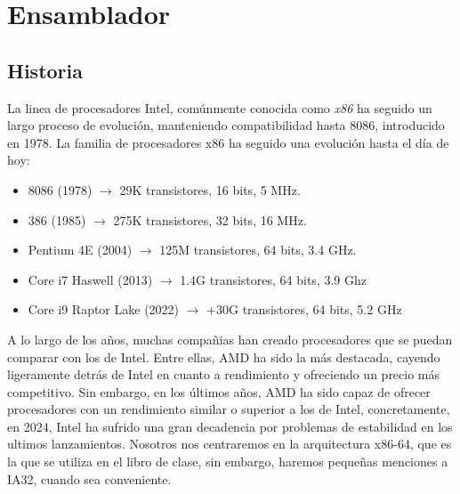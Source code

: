 \chapter{Ensamblador}
\section{Historia}
La linea de procesadores Intel, comúnmente conocida como \textit{x86}
ha seguido un largo proceso de evolución, manteniendo compatibilidad
hasta 8086, introducido en 1978. La familia de procesadores x86 ha seguido una evolución hasta
el día de hoy:
\begin{itemize}
	\item 8086 (1978) $\rightarrow$ 29K transistores, 16 bits, 5 MHz. 
	\item 386 (1985) $\rightarrow$ 275K transistores, 32 bits, 16 MHz. 
	\item Pentium 4E (2004) $\rightarrow$ 125M transistores, 64 bits, 3.4 GHz. 
	\item Core i7 Haswell (2013) $\rightarrow$ 1.4G transistores, 64 bits, 3.9 Ghz 
	\item Core i9 Raptor Lake (2022) $ \rightarrow$ +30G transistores, 64 bits, 5.2 GHz 
\end{itemize}
A lo largo de los años, muchas compañias han creado procesadores
que se puedan comparar con los de Intel. Entre ellas, AMD ha sido
la más destacada, cayendo ligeramente detrás de Intel en cuanto a rendimiento
y ofreciendo un precio más competitivo. Sin embargo, en los últimos años, AMD ha
sido capaz de ofrecer procesadores con un rendimiento similar o superior a los de Intel,
concretamente, en 2024, Intel ha sufrido una gran decadencia por problemas de estabilidad
en los ultimos lanzamientos.
Nosotros nos centraremos en la arquitectura x86-64, que es la que se utiliza en el libro de
clase, sin embargo, haremos pequeñas menciones a IA32, cuando sea conveniente.

